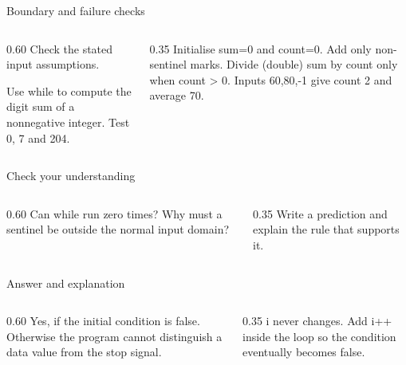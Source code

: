 \documentclass[10pt,aspectratio=169]{beamer}
\begin{document}
\begin{frame}[fragile,t]{Boundary and failure checks}
\begin{columns}[T,onlytextwidth]\begin{column}{0.60\textwidth}
Check the stated input assumptions.

Use while to compute the digit sum of a nonnegative integer. Test 0, 7 and 204.
\end{column}\begin{column}{0.35\textwidth}\small
Initialise sum=0 and count=0. Add only non-sentinel marks. Divide (double) sum by count only when count \textgreater{} 0. Inputs 60,80,-1 give count 2 and average 70.
\end{column}\end{columns}
\end{frame}

\begin{frame}[fragile,t]{Check your understanding}
\begin{columns}[T,onlytextwidth]\begin{column}{0.60\textwidth}
Can while run zero times? Why must a sentinel be outside the normal input domain?
\end{column}\begin{column}{0.35\textwidth}\small
Write a prediction and explain the rule that supports it.
\end{column}\end{columns}
\end{frame}

\begin{frame}[fragile,t]{Answer and explanation}
\begin{columns}[T,onlytextwidth]\begin{column}{0.60\textwidth}
Yes, if the initial condition is false. Otherwise the program cannot distinguish a data value from the stop signal.
\end{column}\begin{column}{0.35\textwidth}\small
i never changes. Add i++ inside the loop so the condition eventually becomes false.
\end{column}\end{columns}
\end{frame}
\end{document}
